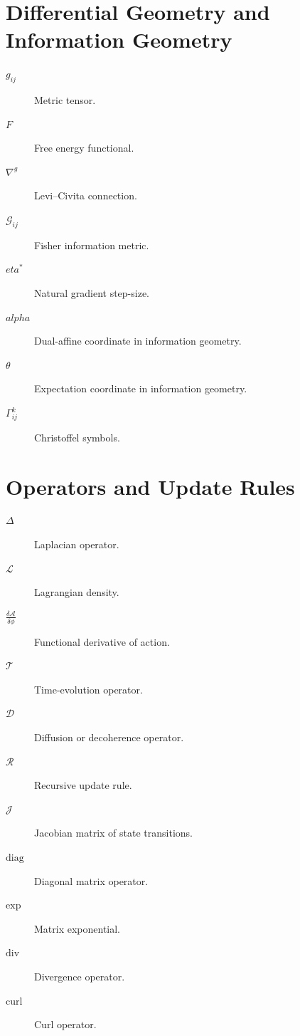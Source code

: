 \documentclass[12pt,oneside]{book}
\theoremstyle{plain}
\theoremstyle{definition}
\def\alpha{alpha}%
\def\eta{eta}%
\begin{document}
\section{Differential Geometry and Information Geometry}

\begin{description}

  \item[$g_{ij}$] Metric tensor.

  \item[$F$] Free energy functional.

  \item[$\nabla^g$] Levi–Civita connection.

  \item[$\mathcal{G}_{ij}$] Fisher information metric.

  \item[$\eta^*$] Natural gradient step-size.

  \item[$\alpha$] Dual-affine coordinate in information geometry.

  \item[$\theta$] Expectation coordinate in information geometry.

  \item[$\Gamma^k_{ij}$] Christoffel symbols.

\end{description}

\section{Operators and Update Rules}

\begin{description}

  \item[$\Delta$] Laplacian operator.

  \item[$\mathcal{L}$] Lagrangian density.

  \item[$\frac{\delta \mathcal{A}}{\delta \phi}$] Functional derivative of action.

  \item[$\mathcal{T}$] Time-evolution operator.

  \item[$\mathcal{D}$] Diffusion or decoherence operator.

  \item[$\mathcal{R}$] Recursive update rule.

  \item[$\mathcal{J}$] Jacobian matrix of state transitions.

  \item[$\mathrm{diag}$] Diagonal matrix operator.

  \item[$\mathrm{exp}$] Matrix exponential.

  \item[$\mathrm{div}$] Divergence operator.

  \item[$\mathrm{curl}$] Curl operator.

\end{description}
\end{document}
